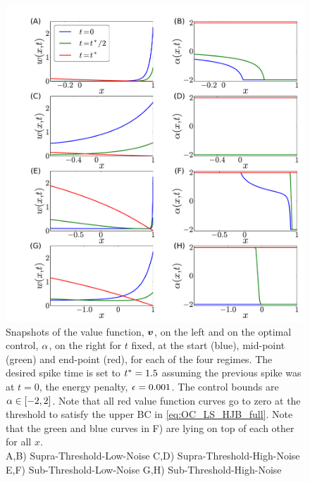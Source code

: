 \begin{figure}[htp] 
\begin{center} 
  \includegraphics[width=\textwidth]{Figs/HJB/Regimes_vc_cuts.pdf} 
  \caption[labelInTOC]{Snapshots of the value function, ${ \boldsymbol{v} }$, on the left and on 
  the optimal control, ${\alpha}$, on the right for $t$ fixed, at the start (blue), 
  mid-point (green) and end-point (red), for each of the four regimes. 
  The desired spike time is set to ${ t^* }=1.5$ assuming the previous spike was at 
  $t=0$, the energy penalty, ${\epsilon} = 0.001$. The control bounds are ${\alpha} \in 
  [-2,2]$.  
  Note that all red value function curves go to zero at the threshold to satisfy 
  the upper BC in \cref{eq:OC_LS_HJB_full}. 
  Note that the green and blue 
  curves in F) are lying on top of each other for all $x$. 
  \\ 
  A,B) Supra-Threshold-Low-Noise 
  C,D) Supra-Threshold-High-Noise 
  E,F) Sub-Threshold-Low-Noise 
  G,H) Sub-Threshold-High-Noise 
  } 
\label{fig:HJB_4regimes_value_control_cuts} 
\end{center} 
\end{figure} 
